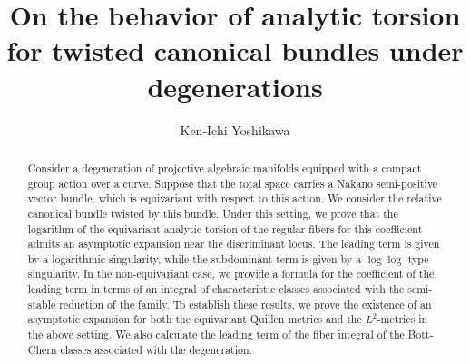 \documentclass[amscd, leqno]{amsart}
\theoremstyle{plain}
\theoremstyle{definition}
\theoremstyle{remark}
\begin{document}
\title[analytic torsion under degenerations]
{On the behavior of analytic torsion for twisted canonical bundles under degenerations}
\author{Ken-Ichi Yoshikawa}
\address{
Department of Mathematics,
Faculty of Science,
Kyoto University,
Kyoto 606-8502, JAPAN}


\begin{abstract}
Consider a degeneration of projective algebraic manifolds equipped with a compact group action over a curve.
Suppose that the total space carries a Nakano semi-positive vector bundle, which is equivariant with respect to this action. 
We consider the relative canonical bundle twisted by this bundle.
Under this setting, we prove that the logarithm of the equivariant analytic torsion of the regular fibers for this coefficient
admits an asymptotic expansion near the discriminant locus.
The leading term is given by a logarithmic singularity, while the subdominant term is given by a $\log\log$-type singularity. 
In the non-equivariant case, we provide a formula for the coefficient of the leading term in terms of an integral of characteristic classes associated with the semi-stable reduction of the family. 
To establish these results, we prove the existence of an asymptotic expansion for both the equivariant Quillen metrics and the $L^{2}$-metrics 
in the above setting. We also calculate the leading term of the fiber integral of the Bott-Chern classes associated with the degeneration. 
\end{abstract}


\maketitle
\tableofcontents

\end{document}
